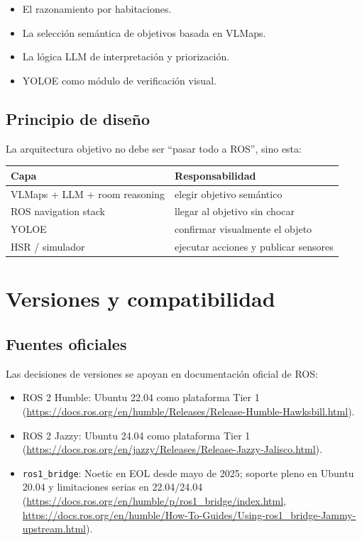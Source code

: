 \documentclass[11pt,a4paper]{article}
\begin{document}
\begin{itemize}
  \item El razonamiento por habitaciones.
  \item La selección semántica de objetivos basada en VLMaps.
  \item La lógica LLM de interpretación y priorización.
  \item YOLOE como módulo de verificación visual.
\end{itemize}

\subsection{Principio de diseño}

La arquitectura objetivo no debe ser ``pasar todo a ROS'', sino esta:

\begin{center}
\begin{tabular}{ll}
\toprule
\textbf{Capa} & \textbf{Responsabilidad} \\
\midrule
VLMaps + LLM + room reasoning & elegir objetivo semántico \\
ROS navigation stack & llegar al objetivo sin chocar \\
YOLOE & confirmar visualmente el objeto \\
HSR / simulador & ejecutar acciones y publicar sensores \\
\bottomrule
\end{tabular}
\end{center}

\section{Versiones y compatibilidad}

\subsection{Fuentes oficiales}

Las decisiones de versiones se apoyan en documentación oficial de ROS:

\begin{itemize}
  \item ROS 2 Humble: Ubuntu 22.04 como plataforma Tier 1
        (\url{https://docs.ros.org/en/humble/Releases/Release-Humble-Hawksbill.html}).
  \item ROS 2 Jazzy: Ubuntu 24.04 como plataforma Tier 1
        (\url{https://docs.ros.org/en/jazzy/Releases/Release-Jazzy-Jalisco.html}).
  \item \texttt{ros1\_bridge}: Noetic en EOL desde mayo de 2025; soporte pleno
        en Ubuntu 20.04 y limitaciones serias en 22.04/24.04
        (\url{https://docs.ros.org/en/humble/p/ros1_bridge/index.html},
        \url{https://docs.ros.org/en/humble/How-To-Guides/Using-ros1_bridge-Jammy-upstream.html}).
\end{itemize}
\end{document}
